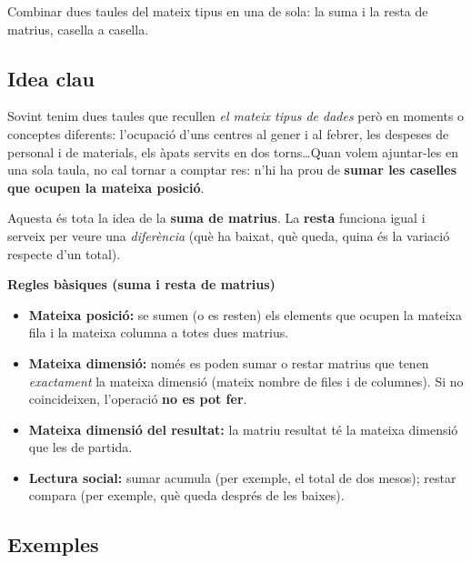 %
{Combinar dues taules del mateix tipus en una de sola: la suma i la resta de matrius, casella a casella.}

\subsection{Idea clau}

Sovint tenim dues taules que recullen \emph{el mateix tipus de dades} però en
moments o conceptes diferents: l'ocupació d'uns centres al gener i al febrer, les
despeses de personal i de materials, els àpats servits en dos torns\dots Quan
volem ajuntar-les en una sola taula, no cal tornar a comptar res: n'hi ha prou de
\textbf{sumar les caselles que ocupen la mateixa posició}.

Aquesta és tota la idea de la \textbf{suma de matrius}. La \textbf{resta}
funciona igual i serveix per veure una \emph{diferència} (què ha baixat, què
queda, quina és la variació respecte d'un total).

\begin{idea}
\textbf{Regles bàsiques (suma i resta de matrius)}
\begin{itemize}[leftmargin=1.4em, itemsep=2pt]
  \item \textbf{Mateixa posició:} se sumen (o es resten) els elements que ocupen
        la mateixa fila i la mateixa columna a totes dues matrius.
  \item \textbf{Mateixa dimensió:} només es poden sumar o restar matrius que
        tenen \emph{exactament} la mateixa dimensió (mateix nombre de files i de
        columnes). Si no coincideixen, l'operació \textbf{no es pot fer}.
  \item \textbf{Mateixa dimensió del resultat:} la matriu resultat té la mateixa
        dimensió que les de partida.
  \item \textbf{Lectura social:} sumar acumula (per exemple, el total de dos
        mesos); restar compara (per exemple, què queda després de les baixes).
\end{itemize}
\end{idea}

\subsection{Exemples}

